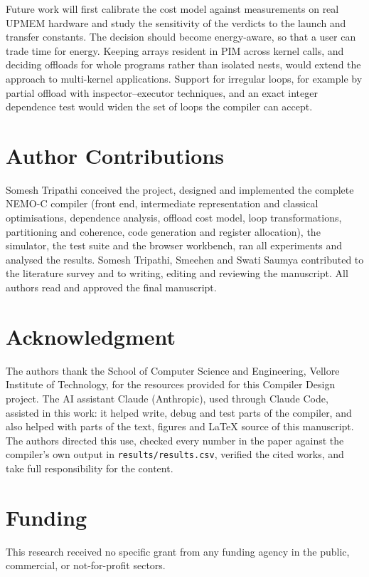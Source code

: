 \documentclass{ieeeaccess}
\begin{document}
Future work will first calibrate the cost model against measurements on real UPMEM hardware and study the sensitivity of the verdicts to the launch and transfer constants. The decision should become energy-aware, so that a user can trade time for energy. Keeping arrays resident in PIM across kernel calls, and deciding offloads for whole programs rather than isolated nests, would extend the approach to multi-kernel applications. Support for irregular loops, for example by partial offload with inspector--executor techniques, and an exact integer dependence test would widen the set of loops the compiler can accept.

\section*{Author Contributions}
Somesh Tripathi conceived the project, designed and implemented the complete NEMO-C compiler (front end, intermediate representation and classical optimisations, dependence analysis, offload cost model, loop transformations, partitioning and coherence, code generation and register allocation), the simulator, the test suite and the browser workbench, ran all experiments and analysed the results. Somesh Tripathi, Smeehen and Swati Saumya contributed to the literature survey and to writing, editing and reviewing the manuscript. All authors read and approved the final manuscript.

\section*{Acknowledgment}
The authors thank the School of Computer Science and Engineering, Vellore Institute of Technology, for the resources provided for this Compiler Design project. The AI assistant Claude (Anthropic), used through Claude Code, assisted in this work: it helped write, debug and test parts of the compiler, and also helped with parts of the text, figures and LaTeX source of this manuscript. The authors directed this use, checked every number in the paper against the compiler's own output in \texttt{results/results.csv}, verified the cited works, and take full responsibility for the content.

\section*{Funding}
This research received no specific grant from any funding agency in the public, commercial, or not-for-profit sectors.
\end{document}
